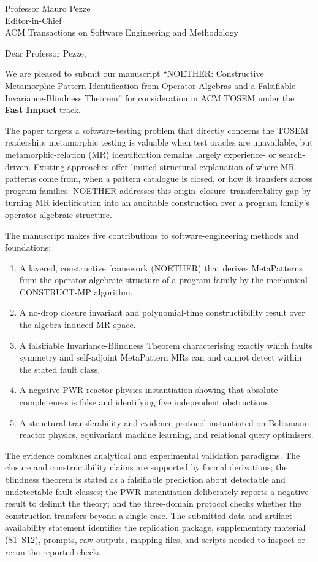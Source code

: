\documentclass[11pt]{letter}
\begin{document}
\begin{letter}{Professor Mauro Pezze\\
Editor-in-Chief\\
ACM Transactions on Software Engineering and Methodology}

\opening{Dear Professor Pezze,}

We are pleased to submit our manuscript ``NOETHER: Constructive Metamorphic Pattern Identification from Operator Algebras and a Falsifiable Invariance-Blindness Theorem'' for consideration in ACM TOSEM under the \textbf{Fast Impact} track.

The paper targets a software-testing problem that directly concerns the TOSEM readership: metamorphic testing is valuable when test oracles are unavailable, but metamorphic-relation (MR) identification remains largely experience- or search-driven. Existing approaches offer limited structural explanation of where MR patterns come from, when a pattern catalogue is closed, or how it transfers across program families. NOETHER addresses this origin--closure--transferability gap by turning MR identification into an auditable construction over a program family's operator-algebraic structure.

The manuscript makes five contributions to software-engineering methods and foundations:

\begin{enumerate}
\item A layered, constructive framework (NOETHER) that derives MetaPatterns from the operator-algebraic structure of a program family by the mechanical CONSTRUCT-MP algorithm.
\item A no-drop closure invariant and polynomial-time constructibility result over the algebra-induced MR space.
\item A falsifiable Invariance-Blindness Theorem characterising exactly which faults symmetry and self-adjoint MetaPattern MRs can and cannot detect within the stated fault class.
\item A negative PWR reactor-physics instantiation showing that absolute completeness is false and identifying five independent obstructions.
\item A structural-transferability and evidence protocol instantiated on Boltzmann reactor physics, equivariant machine learning, and relational query optimisers.
\end{enumerate}

The evidence combines analytical and experimental validation paradigms. The closure and constructibility claims are supported by formal derivations; the blindness theorem is stated as a falsifiable prediction about detectable and undetectable fault classes; the PWR instantiation deliberately reports a negative result to delimit the theory; and the three-domain protocol checks whether the construction transfers beyond a single case. The submitted data and artifact availability statement identifies the replication package, supplementary material (S1--S12), prompts, raw outputs, mapping files, and scripts needed to inspect or rerun the reported checks.


\end{letter}
\end{document}
